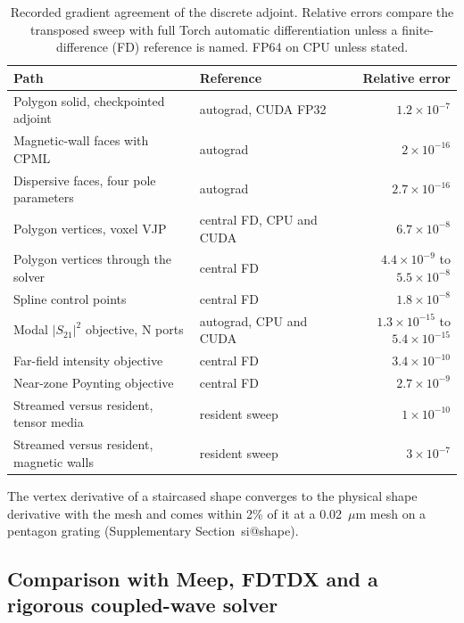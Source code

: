 \documentclass[preprint,11pt]{elsarticle}
\makeatletter
\newcommand{\micron}{\ensuremath{\mu\mathrm{m}}}
\newcommand{\suppsec}[1]{Supplementary Section~\csname si@#1\endcsname}
\makeatother
\begin{document}
\begin{table}[tbp]
\centering
\small
\renewcommand{\arraystretch}{1.15}
\caption{Recorded gradient agreement of the discrete adjoint. Relative errors compare the transposed sweep with full Torch automatic differentiation unless a finite-difference (FD) reference is named. FP64 on CPU unless stated.}
\label{tab:gradients}
\setlength{\tabcolsep}{3pt}
\begin{tabular}{@{}llr@{}}
\toprule
Path & Reference & Relative error \\
\midrule
Polygon solid, checkpointed adjoint & autograd, CUDA FP32 & $1.2\times10^{-7}$ \\
Magnetic-wall faces with CPML & autograd & $2\times10^{-16}$ \\
Dispersive faces, four pole parameters & autograd & $2.7\times10^{-16}$ \\
Polygon vertices, voxel VJP & central FD, CPU and CUDA & $6.7\times10^{-8}$ \\
Polygon vertices through the solver & central FD & $4.4\times10^{-9}$ to $5.5\times10^{-8}$ \\
Spline control points & central FD & $1.8\times10^{-8}$ \\
Modal $|S_{21}|^{2}$ objective, N ports & autograd, CPU and CUDA & $1.3\times10^{-15}$ to $5.4\times10^{-15}$ \\
Far-field intensity objective & central FD & $3.4\times10^{-10}$ \\
Near-zone Poynting objective & central FD & $2.7\times10^{-9}$ \\
Streamed versus resident, tensor media & resident sweep & $1\times10^{-10}$ \\
Streamed versus resident, magnetic walls & resident sweep & $3\times10^{-7}$ \\
\bottomrule
\end{tabular}
\end{table}

The vertex derivative of a staircased shape converges to the physical shape derivative with the mesh and comes within 2\% of it at a 0.02~\micron{} mesh on a pentagon grating (\suppsec{shape}).

\subsection{Comparison with Meep, FDTDX and a rigorous coupled-wave solver}
\label{sec:cross-solver}
\end{document}
